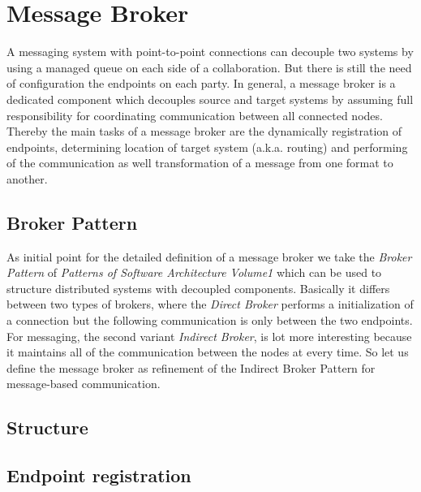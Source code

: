 \section{Message Broker}
A messaging system with point-to-point connections can decouple two systems
by using a managed queue on each side of a collaboration. But there is
still the need of configuration the endpoints on each party. In general, a
message broker is a dedicated component which decouples source and
target systems by assuming full responsibility for coordinating communication between
all connected nodes. Thereby the main tasks of a message broker are the
dynamically registration of endpoints, determining location of target system
(a.k.a. routing) and performing of the communication as well transformation of a
message from one format to another.\cite{MSDNIntegration} \\

\subsection{Broker Pattern}
As initial point for the detailed definition of a message broker we take the
\textit{Broker Pattern} of  \textit{Patterns of Software Architecture Volume1}
which can be used to structure distributed systems with decoupled components.
Basically it differs between two types of brokers, where the \textit{Direct
Broker} performs a initialization of a connection but the following communication
is only between the two endpoints. For messaging, the second variant
\textit{Indirect Broker}, is lot more interesting because it maintains all of
the communication between the nodes at every time. So let us define the message
broker as refinement of the Indirect Broker Pattern for message-based
communication.\cite{POSA1} 

\subsection{Structure}

\subsection{Endpoint registration}
 


